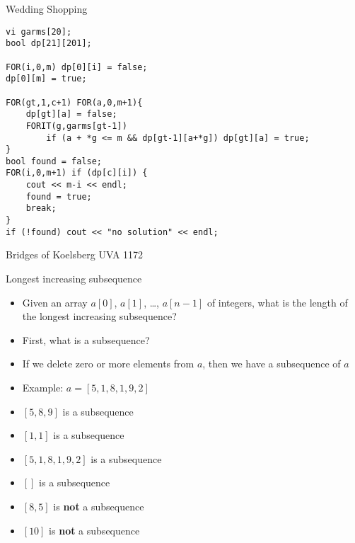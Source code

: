 \documentclass[12pt,t]{beamer}
\newcommand{\bi}{\begin{itemize}}
\newcommand{\ei}{\end{itemize}}
\begin{document}
\begin{frame}[fragile]{Wedding Shopping}
    \begin{verbatim}
vi garms[20];
bool dp[21][201];

FOR(i,0,m) dp[0][i] = false;
dp[0][m] = true;
	
FOR(gt,1,c+1) FOR(a,0,m+1){
    dp[gt][a] = false;
    FORIT(g,garms[gt-1])
        if (a + *g <= m && dp[gt-1][a+*g]) dp[gt][a] = true;
}
bool found = false;
FOR(i,0,m+1) if (dp[c][i]) {
    cout << m-i << endl;
    found = true;
    break;
}
if (!found) cout << "no solution" << endl;
    \end{verbatim}
\end{frame}


\begin{frame}{Bridges of Koelsberg}
	UVA 1172
\end{frame}


\begin{frame}{Longest increasing subsequence}
    \bi
\item Given an array $a[0]$, $a[1]$, \ldots, $a[n-1]$ of integers, what is the length of the longest increasing subsequence?
    \vspace{15pt}
\item First, what is a subsequence?
\item If we delete zero or more elements from $a$, then we have a subsequence of $a$
    \vspace{5pt}
\item Example: $a = [5,1,8,1,9,2]$
    \vspace{5pt}
\item $[5,8,9]$ is a subsequence
\item $[1,1]$ is a subsequence
\item $[5,1,8,1,9,2]$ is a subsequence
\item $[]$ is a subsequence
\item $[8,5]$ is \textbf{not} a subsequence
\item $[10]$ is \textbf{not} a subsequence
    \ei
\end{frame}
\end{document}
